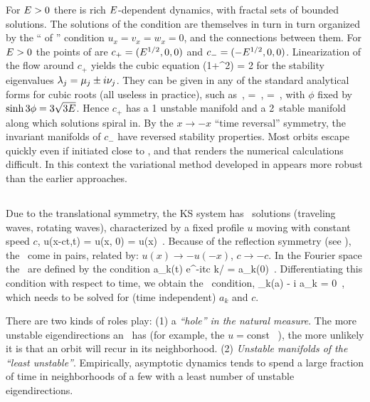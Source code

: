 For $\expctE>0$ there is rich
$\expctE$-dependent dynamics, with
fractal sets of bounded solutions.
The solutions of the {\eqv}  condition
 are themselves in turn  in turn organized by the
``{\eqva}  of {\eqva}''  condition
\( u_x= v_x= w_x= 0 \), and
the connections between them.
    For $\expctE>0$ the {\eqv}  points of  are
$c_{+}=(\expctE^{1/2},0,0)$ and $c_{-}=(-\expctE^{1/2},0,0)$.
Linearization of the flow around
$c_{+}$ yields the cubic equation
  \beq
\eigExp(1+\eigExp^2) = 2\expctE
for the
stability eigenvalues
$\eigExp[j] = \eigRe[j] \pm i \eigIm[j]$.
They can
be given in any of the standard analytical forms for cubic
roots  (all useless in practice), such as
    \,,\qquad
\eigRe=\sinh \phi
\,,\qquad
\eigIm=\cosh \phi \, ,
with $\phi$ fixed by $\sinh 3\phi=3\sqrt{3\expctE}$.
Hence $c_{+}$ has a {1\dmn}
unstable manifold and a 2\dmn\ stable manifold
along which solutions spiral in.
By the $x \to -x$ ``time reversal'' symmetry, the
invariant manifolds of $c_{-}$
have reversed stability properties.
Most orbits escape quickly even if initiated close to \eqva, and that
renders the numerical calculations
difficult.
In this context the variational method
developed in 
appears more robust than
the earlier approaches.

\subsection{\Reqva}
%

Due to the translational symmetry,
the KS system has \reqv\ solutions
(traveling waves, rotating waves),
characterized by a fixed profile $u$
moving with constant speed $c$, {\ie}
\beq
 u(x-ct,t) = u(x, 0) = u(x) %
\,.
Because of the reflection symmetry (see ),
the \reqva\ come in pairs,
related by: $u(x) \to -u(-x)$, $c \to -c$.
In the Fourier space the \reqva\ are defined by the condition
\beq
 a_k(t) e^{-itc k/\tildeL} = a_k(0)
\,.
Differentiating this condition with respect to time, we obtain
the \reqv\ condition,
\beq
 \pVeloc_k(a) - i  a_k = 0
\,,
which needs to be solved for (time independent) $a_k$ and $c$.

%
There are two kinds of roles
{\eqva} play:
(1)
a {\em ``hole'' in the natural measure}.
The more unstable eigendirections an \eqv\ has (for example, the
$u=$const \eqv~), the more unlikely it is  that
an orbit will recur in its neighborhood.
(2)
{\em Unstable manifolds of the ``least unstable''{\eqva}}.
Empirically, asymptotic dynamics tends to spend
a large fraction of time in
neighborhoods of a few  {\eqva} with
a least number of unstable eigendirections.


